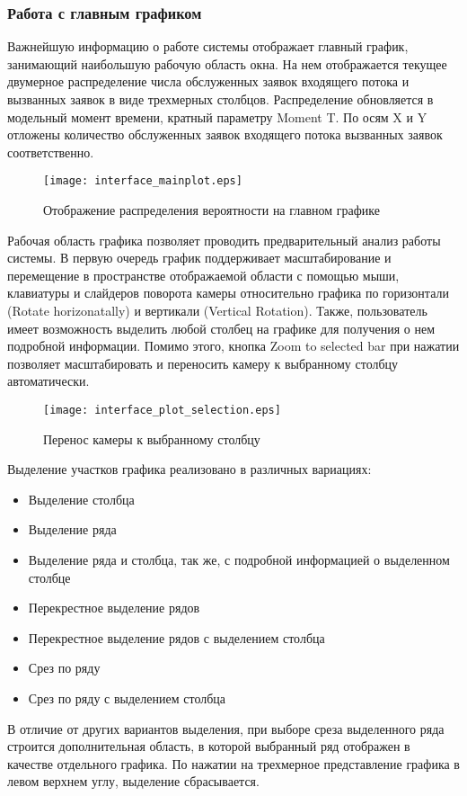 \subsubsection{Работа с главным графиком}
Важнейшую информацию о работе системы отображает главный график, занимающий наибольшую рабочую область окна. На нем отображается текущее двумерное распределение числа обслуженных заявок входящего потока и вызванных заявок в виде трехмерных столбцов. Распределение обновляется в модельный момент времени, кратный параметру Moment T. По осям X и Y отложены количество обслуженных заявок входящего потока вызванных заявок соответственно.
\begin{figure}[H]
	\centering
	\texttt{[image: interface\_mainplot.eps]}
	\caption{Отображение распределения вероятности на главном графике}
	\label{interface_mainplot}
\end{figure}
Рабочая область графика позволяет проводить предварительный анализ работы системы. В первую очередь график поддерживает масштабирование и перемещение в пространстве отображаемой области с помощью мыши, клавиатуры и слайдеров поворота камеры относительно графика по горизонтали (Rotate horizonatally) и вертикали (Vertical Rotation).  Также, пользователь имеет возможность выделить любой столбец на графике для получения о нем подробной информации. Помимо этого, кнопка Zoom to selected bar при нажатии позволяет масштабировать и переносить камеру к выбранному столбцу автоматически.
\begin{figure}[H]
	\centering
	\texttt{[image: interface\_plot\_selection.eps]}
	\caption{Перенос камеры к выбранному столбцу}
	\label{interface_plot_selection}
\end{figure}
Выделение участков графика реализовано в различных вариациях:
\begin{itemize}
	\item Выделение столбца
	\item Выделение ряда
	\item Выделение ряда и столбца, так же, с подробной информацией о выделенном столбце
	\item Перекрестное выделение рядов
	\item Перекрестное выделение рядов с выделением столбца
	\item Срез по ряду
	\item Срез по ряду с выделением столбца
\end{itemize}
В отличие от других вариантов выделения, при выборе среза выделенного ряда строится дополнительная область, в которой выбранный ряд отображен в качестве отдельного графика. По нажатии на трехмерное представление графика в левом верхнем углу, выделение сбрасывается.
